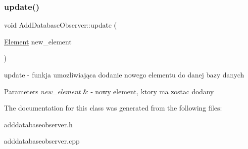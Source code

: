 \subsubsection{\texorpdfstring{update()}{update()}}
{\footnotesize\ttfamily void Add\+Database\+Observer\+::update (\begin{DoxyParamCaption}\item[{\mbox{\hyperlink{class_element}{Element}}}]{new\+\_\+element }\end{DoxyParamCaption})\hspace{0.3cm}{\ttfamily [virtual]}}



update -\/ funkja umozliwiająca dodanie nowego elementu do danej bazy danych 


\begin{DoxyParams}{Parameters}
{\em new\+\_\+element} & -\/ nowy element, ktory ma zostac dodany \\
\hline
\end{DoxyParams}


The documentation for this class was generated from the following files\+:\begin{DoxyCompactItemize}
\item 
adddatabaseobserver.\+h\item 
adddatabaseobserver.\+cpp\end{DoxyCompactItemize}
